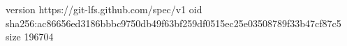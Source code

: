 version https://git-lfs.github.com/spec/v1
oid sha256:ac86656ed3186bbbc9750db49f63bf259df0515ec25e03508789f33b47cf87c5
size 196704
